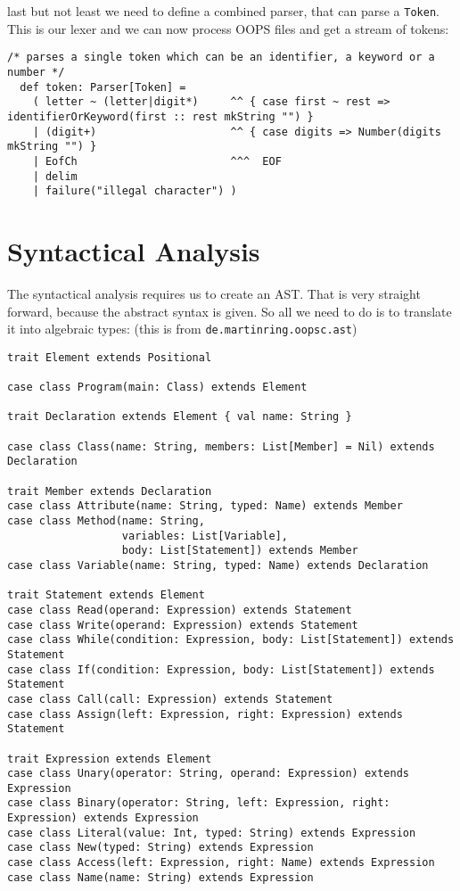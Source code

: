 \documentclass{style}
\begin{document}
last but not least we need to define a combined parser, that can parse a \texttt{Token}. This is our lexer and we can now process OOPS files and get a stream of tokens:

\begin{lstlisting}[name=lexical]
  /* parses a single token which can be an identifier, a keyword or a number */
  def token: Parser[Token] =
    ( letter ~ (letter|digit*)     ^^ { case first ~ rest => identifierOrKeyword(first :: rest mkString "") }
    | (digit+)                     ^^ { case digits => Number(digits mkString "") }
    | EofCh                        ^^^  EOF
    | delim
    | failure("illegal character") )
\end{lstlisting}

\section{Syntactical Analysis}

The syntactical analysis requires us to create an AST. That is very straight forward, because the abstract syntax is given. So all we need to do is to translate it into algebraic types: (this is from \texttt{de.martinring.oopsc.ast})

\begin{lstlisting}[name=syntax]
trait Element extends Positional
  
case class Program(main: Class) extends Element
  
trait Declaration extends Element { val name: String }
  
case class Class(name: String, members: List[Member] = Nil) extends Declaration  

trait Member extends Declaration
case class Attribute(name: String, typed: Name) extends Member
case class Method(name: String, 
                  variables: List[Variable], 
                  body: List[Statement]) extends Member
case class Variable(name: String, typed: Name) extends Declaration
  
trait Statement extends Element
case class Read(operand: Expression) extends Statement
case class Write(operand: Expression) extends Statement
case class While(condition: Expression, body: List[Statement]) extends Statement
case class If(condition: Expression, body: List[Statement]) extends Statement
case class Call(call: Expression) extends Statement
case class Assign(left: Expression, right: Expression) extends Statement

trait Expression extends Element
case class Unary(operator: String, operand: Expression) extends Expression
case class Binary(operator: String, left: Expression, right: Expression) extends Expression
case class Literal(value: Int, typed: String) extends Expression
case class New(typed: String) extends Expression
case class Access(left: Expression, right: Name) extends Expression
case class Name(name: String) extends Expression    
\end{lstlisting}
\end{document}
